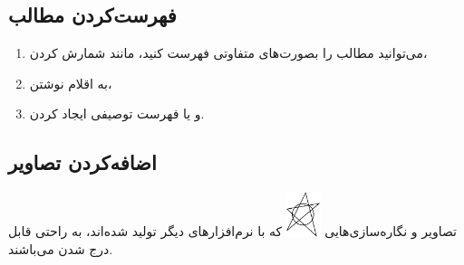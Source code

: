 \documentclass[a4paper,12pt]{article}
\begin{document}
\subsection{فهرست‌کردن مطالب}

\begin{enumerate}
\item می‌توانید مطالب را بصورت‌های متفاوتی فهرست کنید، مانند شمارش کردن،
\item به اقلام نوشتن،
\item و یا فهرست توصیفی ایجاد کردن.
\end{enumerate}

\subsection{اضافه‌کردن تصاویر}

تصاویر و نگاره‌سازی‌هایی
\includegraphics[width=1cm]{demo}
که با نرم‌افزارهای دیگر تولید شده‌اند، به راحتی قابل درج شدن می‌باشند.
\end{document}
